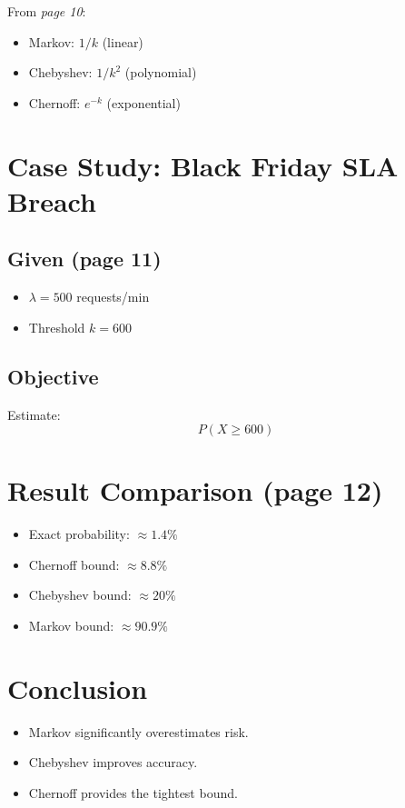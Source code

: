 \documentclass[12pt]{article}
\begin{document}
From \textit{page 10}:
\begin{itemize}
    \item Markov: $1/k$ (linear)
    \item Chebyshev: $1/k^2$ (polynomial)
    \item Chernoff: $e^{-k}$ (exponential)
\end{itemize}

\section*{Case Study: Black Friday SLA Breach}

\subsection*{Given (page 11)}
\begin{itemize}
    \item $\lambda = 500$ requests/min
    \item Threshold $k = 600$
\end{itemize}

\subsection*{Objective}
Estimate:
\[
P(X \ge 600)
\]

\section*{Result Comparison (page 12)}

\begin{itemize}
    \item Exact probability: $\approx 1.4\%$
    \item Chernoff bound: $\approx 8.8\%$
    \item Chebyshev bound: $\approx 20\%$
    \item Markov bound: $\approx 90.9\%$
\end{itemize}

\section*{Conclusion}
\begin{itemize}
    \item Markov significantly overestimates risk.
    \item Chebyshev improves accuracy.
    \item Chernoff provides the tightest bound.
\end{itemize}
\end{document}
